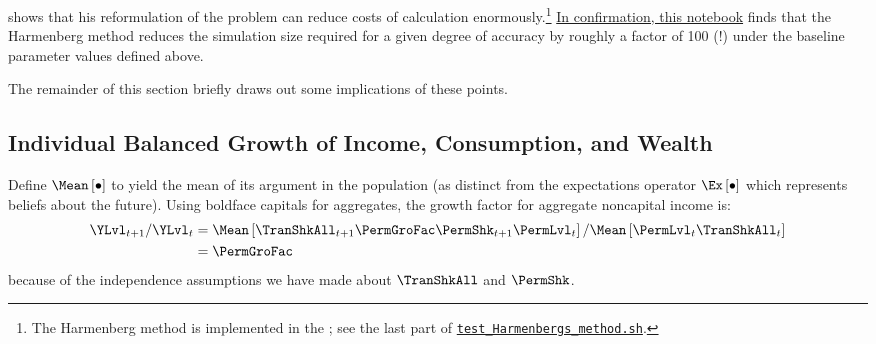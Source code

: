 \documentclass[BufferStockTheory]{subfiles}
\begin{document}
\cite{harmenbergInvariant} shows that his reformulation of the problem can reduce costs of calculation enormously.\footnote{The Harmenberg method is implemented in the {\ARKurl}; see the last part of \href{https://github.com/econ-ark/BufferStockTheory/blob/master/Code/Python/test_Harmenbergs_method.sh}{\texttt{test\_Harmenbergs\_method.sh}}.}  \href{https://econ-ark.org/materials/harmenberg-aggregation}{In confirmation, this notebook} finds that the Harmenberg method reduces the simulation size required for a given degree of accuracy by roughly a factor of 100 (!) under the baseline parameter values defined above.%


The remainder of this section briefly draws out some implications of these points.

\hypertarget{Growth-Rates-of-Individual-Income-and-Consumption}{}
\subsection{Individual Balanced Growth of  Income, Consumption, and Wealth}\label{subsec:cGroEqPermGroFacQ}

Define $\Mean\left[\bullet\right]$ to yield the mean of its argument in the population (as distinct from the expectations operator $\Ex\left[\bullet\right]$ which represents beliefs about the future).  Using boldface capitals for aggregates, the growth factor for aggregate noncapital income is:
\begin{align*}
  \YLvl_{t+1}/\YLvl_{t}  & = \Mean\left[\TranShkAll_{t+1}\PermGroFac \PermShk_{t+1}\PermLvl_{t}\right]/\Mean\left[\PermLvl_{t}\TranShkAll_{t}\right]  \\
                         & = \PermGroFac
\end{align*}
because of the independence assumptions we have made about $\TranShkAll$ and $\PermShk$.
\end{document}
